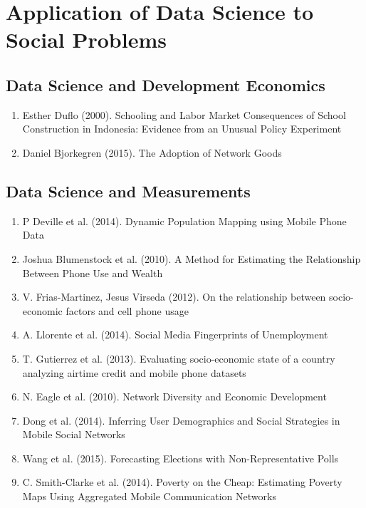 \section{Application of Data Science to Social Problems}
\subsection{Data Science and Development Economics}

\begin{enumerate}
\item Esther Duflo (2000). Schooling and Labor Market Consequences of School Construction in Indonesia: Evidence from an Unusual Policy Experiment  \cite{Duflo_2000}
\item Daniel Bjorkegren (2015). The Adoption of Network Goods  \cite{Bjorkegren}
\end{enumerate}

\subsection{Data Science and Measurements}
\begin{enumerate}
\item P Deville et al. (2014). Dynamic Population Mapping using Mobile Phone Data\cite{Deville_2014}
\item Joshua Blumenstock et al. (2010). A Method for Estimating the Relationship Between Phone Use and Wealth \cite{blumenstock2010method}
\item V. Frias-Martinez, Jesus Virseda (2012). On the relationship between socio-economic factors and cell phone usage \cite{Frias_Martinez_2012}
\item A. Llorente et al. (2014). Social Media Fingerprints of Unemployment \cite{Llorente_2015}
\item T. Gutierrez et al. (2013). Evaluating socio-economic state of a country analyzing airtime credit and mobile phone datasets \cite{gutierrez2013evaluating} 
\item N. Eagle et al. (2010). Network Diversity and Economic Development\cite{eagle2010network}
\item Dong et al. (2014). Inferring User Demographics and Social Strategies in Mobile Social Networks \cite{Dong:2014:IUD:2623330.2623703}
\item Wang et al. (2015). Forecasting Elections with Non-Representative Polls\cite{Wang2015980}
\item C. Smith-Clarke et al. (2014). Poverty on the Cheap: Estimating Poverty Maps Using Aggregated Mobile Communication Networks\cite{Smith-Clarke:2014:PCE:2556288.2557358}
\end{enumerate}

